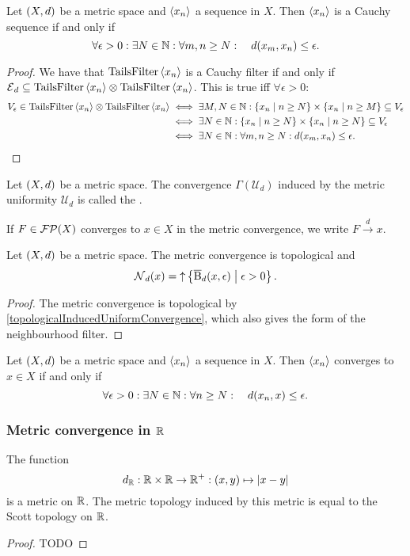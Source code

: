 \begin{lemma}
Let $\left( X,d \right)$ be a metric space and $\left\langle x_n \right\rangle$ a sequence in $X$. Then $\left\langle x_n \right\rangle$ is a Cauchy sequence \textup{if and only if}
\[ \forall \epsilon >0: \exists N\in\mathbb{N}: \forall m,n \geq N: \quad d(x_m, x_n)\leq \epsilon. \]
\end{lemma}
\begin{proof}
We have that $\operatorname{TailsFilter}\left\langle x_n \right\rangle$ is a Cauchy filter \textup{if and only if} $\operatorname{\mathcal{E}}_d \subseteq \operatorname{TailsFilter}\left\langle x_n \right\rangle\otimes \operatorname{TailsFilter}\left\langle x_n \right\rangle$. This is true iff $\forall \epsilon>0$:
\begin{align*}
V_\epsilon \in \operatorname{TailsFilter}\left\langle x_n \right\rangle\otimes \operatorname{TailsFilter}\left\langle x_n \right\rangle &\iff \exists M,N\in\mathbb{N}: \left\{ x_n \;\middle|\; n\geq N \right\}\times\left\{ x_n \;\middle|\; n\geq M \right\} \subseteq V_\epsilon \\
&\iff \exists N\in\mathbb{N}: \left\{ x_n \;\middle|\; n\geq N \right\}\times\left\{ x_n \;\middle|\; n\geq N \right\} \subseteq V_\epsilon \\
&\iff \exists N\in\mathbb{N}: \forall m,n \geq N: d(x_m, x_n)\leq \epsilon.
\end{align*}
\end{proof}

\begin{definition}
Let $\left( X,d \right)$ be a metric space. The convergence $\Gamma(\mathcal{U}_d)$ induced by the metric uniformity $\mathcal{U}_d$ is called the .

If $F\in\operatorname{\mathcal{FP}}(X)$ converges to $x\in X$ in the metric convergence, we write $F\overset{d}{\longrightarrow} x$.
\end{definition}

\begin{lemma}
Let $\left( X,d \right)$ be a metric space. The metric convergence is topological and
\[ \operatorname{\mathcal{N}}_d(x) = \operatorname{\uparrow}\left\{ \operatorname{\overline{B}}_d(x,\epsilon) \;\middle|\; \epsilon >0 \right\}. \]
\end{lemma}
\begin{proof}
The metric convergence is topological by \ref{topologicalInducedUniformConvergence}, which also gives the form of the neighbourhood filter. 
\end{proof}
\begin{corollary}
Let $\left( X,d \right)$ be a metric space and $\left\langle x_n \right\rangle$ a sequence in $X$. Then $\left\langle x_n \right\rangle$ converges to $x\in X$ \textup{if and only if}
\[ \forall \epsilon>0: \exists N\in\mathbb{N}: \forall n\geq N: \quad d(x_n,x)\leq \epsilon. \]
\end{corollary}

\subsubsection{Metric convergence in $\mathbb{R}$}
\begin{lemma}
The function
\[ d_{\mathbb{R}}: \mathbb{R}\times \mathbb{R}\to\mathbb{R}^+: (x,y) \mapsto |x-y| \]
is a metric on $\mathbb{R}$. The metric topology induced by this metric is equal to the Scott topology on $\mathbb{R}$.
\end{lemma}
\begin{proof}
TODO
\end{proof}

